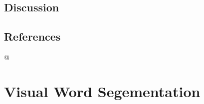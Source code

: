 \documentclass[
12pt, %
english, %
doublespacing, %
nolistspacing, %
liststotoc, %
headsepline, %
chapterinoneline, %
openany, %
]{DoctoralThesis}\usepackage[]{graphicx}\usepackage[]{color}
\begin{document}
\section{Discussion}




\section{References}















@


\chapter{Visual Word Segementation} %

\label{Chapter3} %
\end{document}
